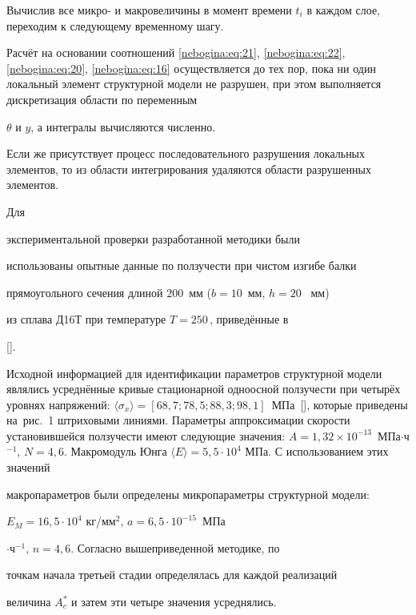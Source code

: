 Вычислив все микро- и макровеличины в момент времени $t_i$ в каждом слое, переходим к следующему временному шагу. 

Расчёт на основании соотношений \eqref{nebogina:eq:21}, \eqref{nebogina:eq:22}, \eqref{nebogina:eq:20}, \eqref{nebogina:eq:16} осуществляется до тех пор, пока ни один локальный элемент структурной модели не разрушен, при этом выполняется дискретизация области по переменным

$\theta$ и $y$, а интегралы вычисляются численно. 

Если же присутствует процесс последовательного разрушения локальных элементов, то из области интегрирования удаляются области разрушенных элементов.



\smallskip



 Для

экспериментальной проверки разработанной методики были

использованы опытные данные по ползучести при чистом изгибе балки

прямоугольного сечения длиной $200$~мм ($b = 10$~мм, $h = 20$~ мм)

из сплава Д16Т при температуре $T=250$\,\textcelsius, приведённые в

[].



Исходной информацией для идентификации параметров структурной модели являлись усреднённые кривые стационарной одноосной  ползучести при четырёх уровнях напряжений: $\langle \sigma_x \rangle =[68,7; 78,5; 88,3; 98,1]$~МПа~[], которые приведены на~рис.~1 штриховыми линиями. Параметры аппроксимации скорости установившейся ползучести имеют следующие значения: $A = 1,32 \times

10^{-13}$~МПа$\cdot$ч$^{-1}$, $N=4,6$. Макромодуль Юнга $\langle

E\rangle =5,5 \cdot 10^4$ МПа. С использованием этих значений

макропараметров были определены микропараметры структурной модели:

$E_M = 16,5 \cdot 10^4$ кг/мм$^2$, $a=6,5 \cdot 10^{-15}$~МПа

$\cdot $ч$^{-1}$, $n=4,6$. Согласно вышеприведенной методике, по

точкам начала третьей стадии определялась для каждой реализаций

величина $A_c^*$  и затем эти четыре значения усреднялись. 

